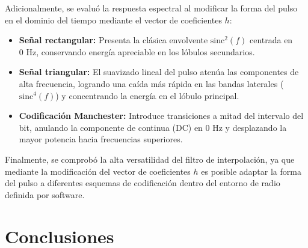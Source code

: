 \documentclass[twocolumn]{IEEEtran}
\begin{document}
Adicionalmente, se evaluó la respuesta espectral al modificar la forma del pulso en el dominio del tiempo mediante el vector de coeficientes $h$:

\begin{itemize}
    \item \textbf{Señal rectangular:} Presenta la clásica envolvente $\text{sinc}^2(f)$ centrada en $0\text{ Hz}$, conservando energía apreciable en los lóbulos secundarios.
    \item \textbf{Señal triangular:} El suavizado lineal del pulso atenúa las componentes de alta frecuencia, logrando una caída más rápida en las bandas laterales ($\text{sinc}^4(f)$) y concentrando la energía en el lóbulo principal.
    \item \textbf{Codificación Manchester:} Introduce transiciones a mitad del intervalo del bit, anulando la componente de continua (DC) en $0\text{ Hz}$ y desplazando la mayor potencia hacia frecuencias superiores.
\end{itemize}
Finalmente, se comprobó la alta versatilidad del filtro de interpolación, ya que mediante la modificación del vector de coeficientes $h$ es posible adaptar la forma del pulso a diferentes esquemas de codificación dentro del entorno de radio definida por software.

\section{Conclusiones}
\end{document}
